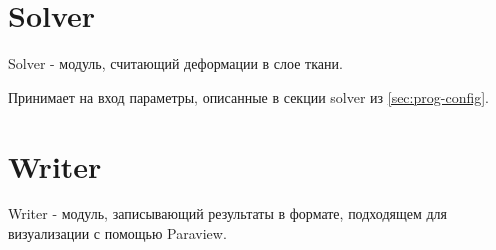 \section{Solver}\label{sec:prog-solver}
Solver - модуль, считающий деформации в слое ткани.

Принимает на вход параметры, описанные в секции solver из \ref{sec:prog-config}.

\section{Writer}\label{sec:prog-writer}
Writer - модуль, записывающий результаты в формате, подходящем для визуализации с помощью Paraview.